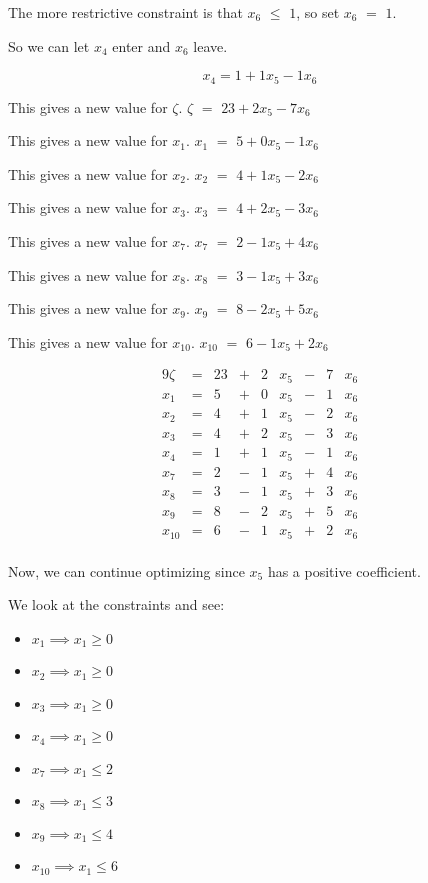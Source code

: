 \documentclass[12pt,letterpaper]{article}
\newcommand*\seeconstraints{
  We look at the constraints and see:
}
\newcommand*\continueopt[1]{
  Now, we can continue optimizing since #1 has a positive coefficient.
}
\newcommand*\enterleave[2]{
  So we can let #1 enter and #2 leave.
}
\newcommand*\morerestrictive[2]{
  The more restrictive constraint is that #1 $\leq$ #2, so set #1 $=$ #2.
}
\newcommand*\newvalue[2]{
  This gives a new value for #1. #1 $ = $ #2
}
\begin{document}
\begin{enumerate}
      \morerestrictive{$x_6$}{$1$}

      \enterleave{$x_4$}{$x_6$}

      \[
        x_4 = 1 + 1 x_5 - 1 x_6
      \]

      \newvalue{$\zeta$}{$23 + 2 x_5 - 7 x_6$}

      \newvalue{$x_1$}{$5  + 0 x_5 - 1 x_6$}

      \newvalue{$x_2$}{$4  + 1 x_5 - 2 x_6$}

      \newvalue{$x_3$}{$4  + 2 x_5 - 3 x_6$}

      \newvalue{$x_7$}{$2  - 1 x_5 + 4 x_6$}

      \newvalue{$x_8$}{$3  - 1 x_5 + 3 x_6$}

      \newvalue{$x_9$}{$8  - 2 x_5 + 5 x_6$}

      \newvalue{$x_{10}$}{$6 - 1 x_5 + 2 x_6$}

      \begin{alignat*}{9}
        \zeta  & {}={} & 23 & {}+{} & 2 & x_5 & {}-{} & 7 & x_6 \\
        x_1    & {}={} & 5  & {}+{} & 0 & x_5 & {}-{} & 1 & x_6 \\
        x_2    & {}={} & 4  & {}+{} & 1 & x_5 & {}-{} & 2 & x_6 \\
        x_3    & {}={} & 4  & {}+{} & 2 & x_5 & {}-{} & 3 & x_6 \\
        x_4    & {}={} & 1  & {}+{} & 1 & x_5 & {}-{} & 1 & x_6 \\
        x_7    & {}={} & 2  & {}-{} & 1 & x_5 & {}+{} & 4 & x_6 \\
        x_8    & {}={} & 3  & {}-{} & 1 & x_5 & {}+{} & 3 & x_6 \\
        x_9    & {}={} & 8  & {}-{} & 2 & x_5 & {}+{} & 5 & x_6 \\
        x_{10} & {}={} & 6  & {}-{} & 1 & x_5 & {}+{} & 2 & x_6 \\
      \end{alignat*}

      \continueopt{$x_5$}

      \seeconstraints

      \begin{itemize}
        \item $x_1    \implies x_1 \geq 0$
        \item $x_2    \implies x_1 \geq 0$
        \item $x_3    \implies x_1 \geq 0$
        \item $x_4    \implies x_1 \geq 0$
        \item $x_7    \implies x_1 \leq 2$
        \item $x_8    \implies x_1 \leq 3$
        \item $x_9    \implies x_1 \leq 4$
        \item $x_{10} \implies x_1 \leq 6$
      \end{itemize}


\end{enumerate}
\end{document}
